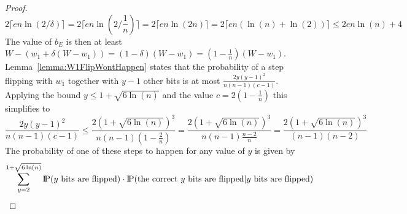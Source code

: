 \begin{proof}
    \[
        2\lceil en\ln(2/\delta)\rceil
        =2\lceil en\ln(2/\frac{1}{n})\rceil
        =2\lceil en\ln(2n)\rceil
        =2\lceil en(\ln(n)+\ln(2))\rceil
        \le 2en\ln(n)+4
    \]
    The value of $b_E$ is then at least \(W-(w_1+\delta(W-w_1))=(1-\delta)(W-w_1)=(1-\frac{1}{n})(W-w_1)\).
    Lemma~\ref{lemma:W1FlipWontHappen} states that the probability of a step flipping with $w_1$ together with $y-1$ other bits is at most $\frac{2y{(y-1)}^2}{n(n-1)(c-1)}$.
    Applying the bound $y\le1+\sqrt{6\ln(n)}$ and the value $c=2(1-\frac{1}{n})$ this simplifies to 
    \[
        \frac{2y{(y-1)}^2}{n(n-1)(c-1)}
        \le\frac{2{(1+\sqrt{6\ln(n)})}^3}{n(n-1)(1-\frac{2}{n})}
        =\frac{2{(1+\sqrt{6\ln(n)})}^3}{n(n-1)\frac{n-2}{n}}
        =\frac{2{(1+\sqrt{6\ln(n)})}^3}{(n-1)(n-2)}
    \]
    The probability of one of these steps to happen for any value of $y$ is given by
    \begin{gather}
        \nonumber \sum_{y=2}^{1+\sqrt{6\ln(n)}}{\probP(y \text{ bits are flipped})\cdot\probP(\text{the correct $y$ bits are flipped} | y \text{ bits are flipped})}\\

\end{gather}
\end{proof}
